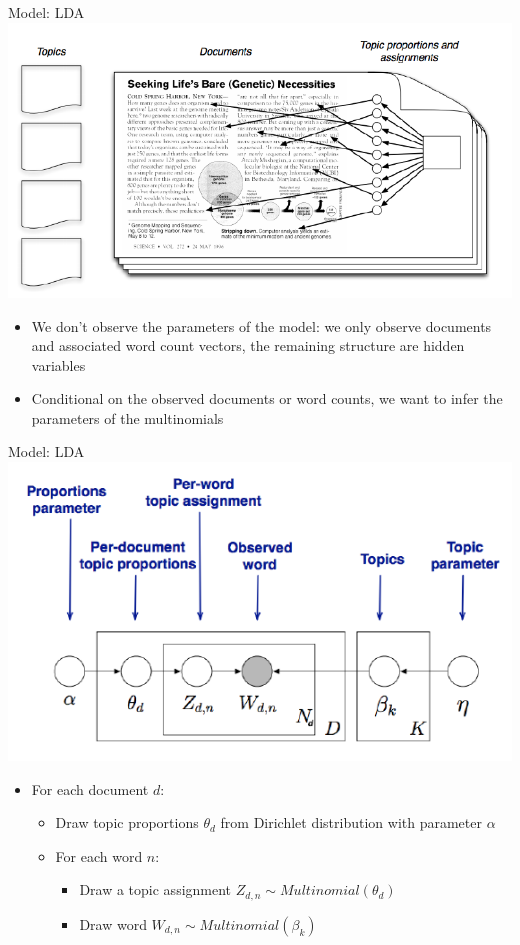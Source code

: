 \documentclass[english]{beamer}
\begin{document}
\begin{frame}{Model: LDA}
\centering
\includegraphics[width=0.8 \textwidth]{Images/blei2.png}
\begin{itemize}
\setlength{\itemsep}{1em}
    \item We don't observe the parameters of the model: we only observe documents and associated word count vectors, the remaining structure are hidden variables
    \item Conditional on the observed documents or word counts, we want to infer the parameters of the multinomials
\end{itemize}
\end{frame}
\begin{frame}{Model: LDA}
\centering
\includegraphics[width=0.7 \textwidth]{Images/platenotation2.png}
\begin{itemize}\setlength{\itemsep}{1em}
\item For each document $d$:
\vspace{4pt}
\begin{itemize}\setlength{\itemsep}{0.8em}
\item Draw topic proportions $\theta_d$ from Dirichlet distribution with parameter $\alpha$ 
\item For each word $n$:
\vspace{4pt}
\begin{itemize}
\setlength{\itemsep}{0.5em}
            \item Draw a topic assignment $Z_{d,n} \sim Multinomial (\theta_d)$
            \item Draw word $W_{d,n} \sim Multinomial (\beta_k)$
        \end{itemize}
    \end{itemize}
\end{itemize}
\end{frame}
\end{document}
